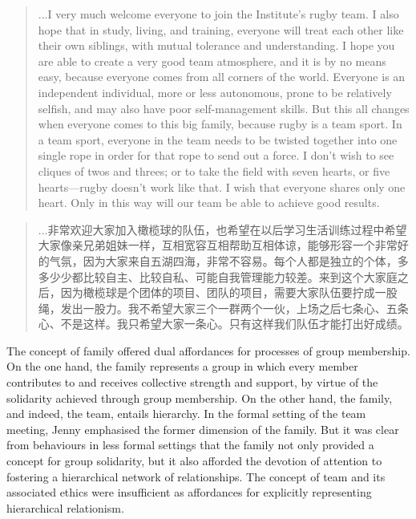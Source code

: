 \begin{CJK}{UTF8}{gbsn}
      \begin{quotation}
        ...I very much welcome everyone to join the Institute's rugby team. I also hope that in study, living, and training, everyone will treat each other like their own siblings, with mutual tolerance and understanding.  I hope you are able to create a very good team atmosphere, and it is by no means easy, because everyone comes from all corners of the world. Everyone is an independent individual, more or less autonomous, prone to be relatively selfish, and may also have poor self-management skills.  But this all changes when everyone comes to this big family, because rugby is a team sport. In a team sport, everyone in the team needs to be twisted together into one single rope in order for that rope to send out a force. I don't wish to see cliques of twos and threes; or to take the field with seven hearts, or five hearts---rugby doesn't work like that. I wish that everyone shares only one heart. Only in this way will our team be able to achieve good results.
      \end{quotation}

      \begin{quotation}
        ...非常欢迎大家加入橄榄球的队伍，也希望在以后学习生活训练过程中希望大家像亲兄弟姐妹一样，互相宽容互相帮助互相体谅，能够形容一个非常好的气氛，因为大家来自五湖四海，非常不容易。每个人都是独立的个体，多多少少都比较自主、比较自私、可能自我管理能力较差。来到这个大家庭之后，因为橄榄球是个团体的项目、团队的项目，需要大家队伍要拧成一股绳，发出一股力。我不希望大家三个一群两个一伙，上场之后七条心、五条心、不是这样。我只希望大家一条心。只有这样我们队伍才能打出好成绩。
      \end{quotation}

The concept of family offered dual affordances for processes of group membership.  On the one hand, the family represents a group in which every member contributes to and receives collective strength and support, by virtue of the solidarity achieved through group membership.  On the other hand, the family, and indeed, the team,  entails hierarchy.  In the formal setting of the team meeting, Jenny emphasised the former dimension of the family.  But it was clear from behaviours in less formal settings that the family not only provided a concept for group solidarity, but it   also afforded the devotion of attention to fostering a hierarchical network of relationships.  The concept of team and its associated ethics were insufficient as  affordances for explicitly representing hierarchical relationism.


\end{CJK}
